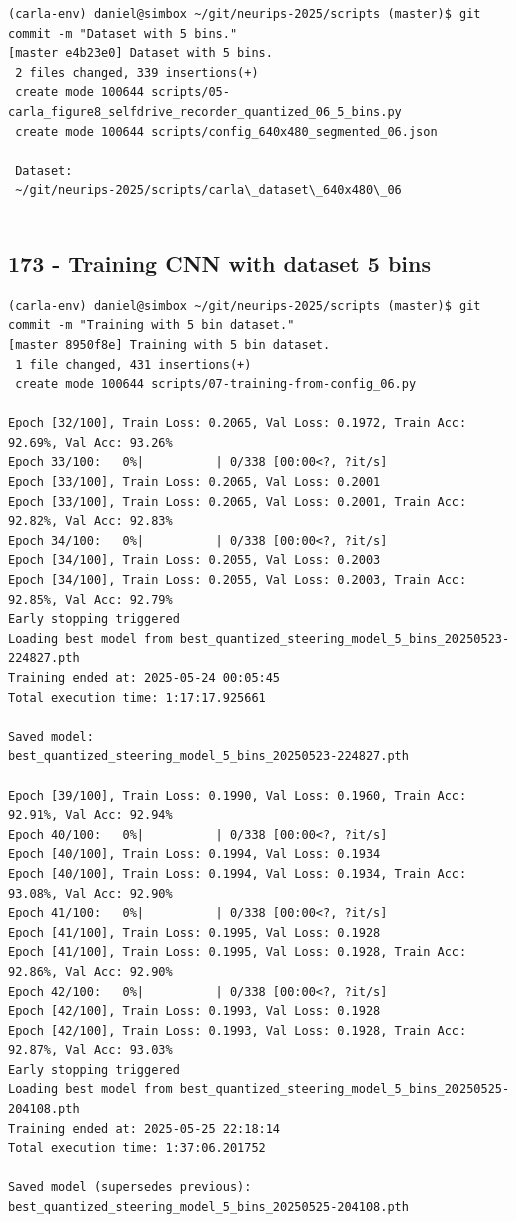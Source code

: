 \begin{verbatim}
(carla-env) daniel@simbox ~/git/neurips-2025/scripts (master)$ git commit -m "Dataset with 5 bins."
[master e4b23e0] Dataset with 5 bins.
 2 files changed, 339 insertions(+)
 create mode 100644 scripts/05-carla_figure8_selfdrive_recorder_quantized_06_5_bins.py
 create mode 100644 scripts/config_640x480_segmented_06.json

 Dataset:
 ~/git/neurips-2025/scripts/carla\_dataset\_640x480\_06
 

\end{verbatim}

\subsection{173 - Training CNN with dataset 5 bins}
\label{app_res:173}

\begin{verbatim}
(carla-env) daniel@simbox ~/git/neurips-2025/scripts (master)$ git commit -m "Training with 5 bin dataset."
[master 8950f8e] Training with 5 bin dataset.
 1 file changed, 431 insertions(+)
 create mode 100644 scripts/07-training-from-config_06.py

Epoch [32/100], Train Loss: 0.2065, Val Loss: 0.1972, Train Acc: 92.69%, Val Acc: 93.26%
Epoch 33/100:   0%|          | 0/338 [00:00<?, ?it/s]
Epoch [33/100], Train Loss: 0.2065, Val Loss: 0.2001
Epoch [33/100], Train Loss: 0.2065, Val Loss: 0.2001, Train Acc: 92.82%, Val Acc: 92.83%
Epoch 34/100:   0%|          | 0/338 [00:00<?, ?it/s]
Epoch [34/100], Train Loss: 0.2055, Val Loss: 0.2003
Epoch [34/100], Train Loss: 0.2055, Val Loss: 0.2003, Train Acc: 92.85%, Val Acc: 92.79%
Early stopping triggered
Loading best model from best_quantized_steering_model_5_bins_20250523-224827.pth
Training ended at: 2025-05-24 00:05:45
Total execution time: 1:17:17.925661

Saved model:
best_quantized_steering_model_5_bins_20250523-224827.pth

Epoch [39/100], Train Loss: 0.1990, Val Loss: 0.1960, Train Acc: 92.91%, Val Acc: 92.94%
Epoch 40/100:   0%|          | 0/338 [00:00<?, ?it/s]
Epoch [40/100], Train Loss: 0.1994, Val Loss: 0.1934
Epoch [40/100], Train Loss: 0.1994, Val Loss: 0.1934, Train Acc: 93.08%, Val Acc: 92.90%
Epoch 41/100:   0%|          | 0/338 [00:00<?, ?it/s]
Epoch [41/100], Train Loss: 0.1995, Val Loss: 0.1928
Epoch [41/100], Train Loss: 0.1995, Val Loss: 0.1928, Train Acc: 92.86%, Val Acc: 92.90%
Epoch 42/100:   0%|          | 0/338 [00:00<?, ?it/s]
Epoch [42/100], Train Loss: 0.1993, Val Loss: 0.1928
Epoch [42/100], Train Loss: 0.1993, Val Loss: 0.1928, Train Acc: 92.87%, Val Acc: 93.03%
Early stopping triggered
Loading best model from best_quantized_steering_model_5_bins_20250525-204108.pth
Training ended at: 2025-05-25 22:18:14
Total execution time: 1:37:06.201752

Saved model (supersedes previous):
best_quantized_steering_model_5_bins_20250525-204108.pth

\end{verbatim}

